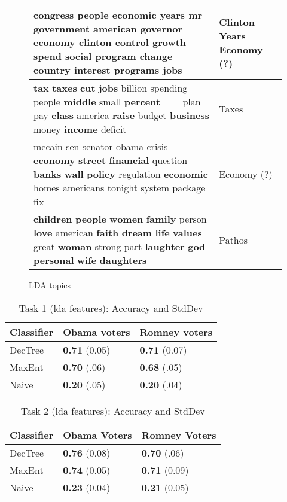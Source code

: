 \begin{figure*}
\begin{flushleft}
\begin{supertabular}{|m{4.8087597in}|m{1.1906599in}|}
{ congress people economic years mr government american governor economy clinton control growth
spend social program change country interest programs jobs} &
{ Clinton Years Economy (?)}\\\hline
{ \textbf{tax} \textbf{taxes} \textbf{cut} \textbf{jobs} billion spending people \textbf{middle}
small \textbf{percent} \ \ \ \ plan pay \textbf{class} america \textbf{raise} budget \textbf{business} money
\textbf{income} deficit} &
{ Taxes}\\\hline
{ mccain sen senator obama crisis \textbf{economy} \textbf{street} \textbf{financial} question
\textbf{banks} \textbf{wall} \textbf{policy} regulation \textbf{economic} homes americans tonight system package fix} &
{ Economy (?)}\\\hline
{ \textbf{children} \textbf{people} \textbf{women} \textbf{family} person \textbf{love} american
\textbf{faith} \textbf{dream} \textbf{life} \textbf{values} great \textbf{woman} strong part \textbf{laughter}
\textbf{god} \textbf{personal} \textbf{wife} \textbf{daughters}} &
{ Pathos}\\\hline
\end{supertabular}
\end{flushleft}
\caption{LDA topics}
\label{fig:ldatopics}
\end{figure*}

\begin{table}[H]
\begin{centering}
\begin{tabular}{ l | l | l }
Classifier & Obama voters & Romney voters \\
\hline
DecTree & \textbf{0.71} (0.05) &  \textbf{0.71} (0.07) \\
MaxEnt & \textbf{0.70} (.06) &  \textbf{0.68} (.05) \\
Naive & \textbf{0.20} (.05) &  \textbf{0.20} (.04) \\
\end{tabular}
\caption{Task 1 (lda features): Accuracy and StdDev}
\label{tab:task1lda}
\end{centering}
\end{table}

\begin{table}[H]
\begin{centering}
\begin{tabular}{ l | l | l }
Classifier & Obama Voters & Romney Voters \\
\hline
DecTree & \textbf{0.76} (0.08) &  \textbf{0.70} (.06) \\
MaxEnt & \textbf{0.74} (0.05) &  \textbf{0.71} (0.09) \\
Naive & \textbf{0.23} (0.04) &  \textbf{0.21} (0.05) \\
\end{tabular}
\caption{Task 2 (lda features): Accuracy and StdDev}
\label{tab:task2lda}
\end{centering}
\end{table}

